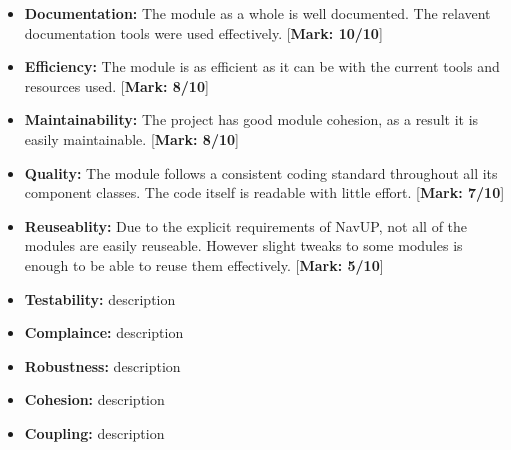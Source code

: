 \documentclass[runningheads,a4paper]{article}
\begin{document}
	\begin{itemize}
		\item \textbf{Documentation:}
			The module as a whole is well documented. The relavent documentation tools were used effectively. [\textbf{Mark: 10/10}]
			
		\item \textbf{Efficiency:} The module is as efficient as it can be with the current tools and resources used. [\textbf{Mark: 8/10}]
		
		\item \textbf{Maintainability:} The project has good module cohesion, as a result it is easily maintainable. [\textbf{Mark: 8/10}]
		
		\item \textbf{Quality:} The module follows a consistent coding standard throughout all its component classes. The code itself is readable with little effort. [\textbf{Mark: 7/10}]
		
		\item \textbf{Reuseablity:} Due to the explicit requirements of NavUP, not all of the modules are easily reuseable. However slight tweaks to some modules is enough to be able to reuse them effectively. [\textbf{Mark: 5/10}]
		
		\item \textbf{Testability:} description
		\item \textbf{Complaince:} description
		\item \textbf{Robustness:} description
		\item \textbf{Cohesion:} description
		\item \textbf{Coupling:} description\\
		
	\end{itemize}
	
	

\end{document}
